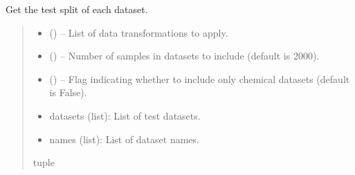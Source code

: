 \documentclass[letterpaper,10pt,english]{sphinxhowto}
\begin{document}

\begin{fulllineitems}
\label{\detokenize{datasets:datasets.get_test_datasets}}
\pysigstartsignatures
{}
\pysigstopsignatures
\sphinxAtStartPar
Get the test split of each dataset.
\begin{quote}\begin{description}
\begin{itemize}
\item {} 
\sphinxAtStartPar
{} () – List of data transformations to apply.

\item {} 
\sphinxAtStartPar
{} () – Number of samples in datasets to include (default is 2000).

\item {} 
\sphinxAtStartPar
{} () – Flag indicating whether to include only chemical datasets (default is False).

\end{itemize}

\sphinxAtStartPar
\begin{description}
\begin{itemize}
\item {} 
\sphinxAtStartPar
datasets (list): List of test datasets.

\item {} 
\sphinxAtStartPar
names (list): List of dataset names.

\end{itemize}

\end{description}


\sphinxAtStartPar
tuple

\end{description}\end{quote}

\end{fulllineitems}
\end{document}
